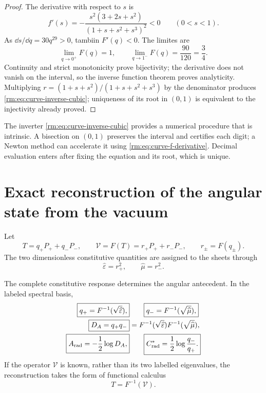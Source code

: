 \begin{proof}
The derivative with respect to \(s\) is
\begin{equation}
 f'(s)
 =-\frac{s^2(3+2s+s^2)}{(1+s+s^2+s^3)^2}<0
 \qquad(0<s<1).
 \label{rm:eq:curve-f-derivative}
\end{equation}
As \(\dd s/\dd q=30q^{29}>0\), tambiin \(F'(q)<0\). The limites are
\[
 \lim_{q\to0^+}F(q)=1,
 \qquad
 \lim_{q\to1^-}F(q)=\frac{90}{120}=\frac34.
\]
Continuity and strict monotonicity prove bijectivity; the derivative
does not vanish on the interval, so the inverse function theorem
proves analyticity. Multiplying
\(r=(1+s+s^2)/(1+s+s^2+s^3)\) by the denominator produces
\cref{rm:eq:curve-inverse-cubic}; uniqueness of its root in \((0,1)\) is
equivalent to the injectivity already proved.
\end{proof}

The inverter \cref{rm:eq:curve-inverse-cubic} provides a numerical procedure that is
intrinsic. A bisection on \((0,1)\) preserves the interval and
certifies each digit; a Newton method can accelerate it using
\cref{rm:eq:curve-f-derivative}. Decimal evaluation enters after
fixing the equation and its root, which is unique.

\section{Exact reconstruction of the angular state from the vacuum}

Let
\begin{equation}
 T=q_+P_++q_-P_-,
 \qquad
 \mathcal V=F(T)=r_+P_++r_-P_-,
 \qquad
 r_\pm=F(q_\pm).
 \label{rm:eq:curve-T-V}
\end{equation}
The two dimensionless constitutive quantities are assigned to the sheets through
\begin{equation}
 \widehat\varepsilon=r_+^2,
 \qquad
 \widehat\mu=r_-^2.
 \label{rm:eq:curve-mu-epsilon}
\end{equation}

\begin{theorem}
\label{rm:thm:curve-vacuum-tomography}
The complete constitutive response determines the angular antecedent. In the
labeled spectral basis,
\begin{align}
 \boxed{q_+=F^{-1}(\sqrt{\widehat\varepsilon}),}
 &\qquad
 \boxed{q_-=F^{-1}(\sqrt{\widehat\mu}),}
 \label{rm:eq:curve-recover-qpm}\\
 \boxed{D_A=q_+q_-}
 &=F^{-1}(\sqrt{\widehat\varepsilon})
   F^{-1}(\sqrt{\widehat\mu}),
 \label{rm:eq:curve-recover-DA}\\
 \boxed{A_{\rm rad}=-\frac12\log D_A,}
 &\qquad
 \boxed{C^*_{\rm rad}=\frac12\log\frac{q_-}{q_+}.}
 \label{rm:eq:curve-recover-A-C}
\end{align}
If the operator \(\mathcal V\) is known, rather than its two labelled
eigenvalues, the reconstruction takes the form of functional calculus
\begin{equation}
 \boxed{T=F^{-1}(\mathcal V).}
 \label{rm:eq:curve-functional-inverse}
\end{equation}
\end{theorem}

